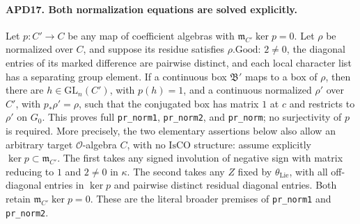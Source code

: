 \paragraph{APD17. Both normalization equations are solved explicitly.}
\label{claim:APD17}
Let \(p:C'\to C\) be any map of coefficient algebras with
\(\mathfrak m_{C'}\ker p=0\).  Let \(\rho\) be normalized
over \(C\), and suppose its residue satisfies
\(\rho.\mathrm{Good}\): \(2\ne0\), the diagonal entries
of its marked difference are pairwise distinct, and each local
character list has a separating group element.  If a continuous
box \(\mathfrak B'\) maps to a box of \(\rho\), then there
are \(h\in\mathrm{GL}_n(C')\), with \(p(h)=1\), and a
continuous normalized \(\rho'\) over \(C'\), with
\(p_*\rho'=\rho\), such that the conjugated box has matrix
\(1\) at \(c\) and restricts to \(\rho'\) on \(G_0\).
This proves full \texttt{pr\_norm1}, \texttt{pr\_norm2}, and
\texttt{pr\_norm}; no surjectivity of \(p\) is required.
More precisely, the two elementary assertions below also allow
an arbitrary target \(\mathcal O\)-algebra \(C\), with no
\(\mathrm{IsCO}\) structure: assume explicitly
\(\ker p\subset\mathfrak m_{C'}\).  The first takes any
signed involution of negative sign with matrix reducing to
\(1\) and \(2\ne0\) in \(\kappa\).  The second takes
any \(Z\) fixed by \(\theta_{\mathrm{Lie}}\), with all
off-diagonal entries in \(\ker p\) and pairwise distinct
residual diagonal entries.  Both retain
\(\mathfrak m_{C'}\ker p=0\).  These are the literal broader
premises of \texttt{pr\_norm1} and \texttt{pr\_norm2}.

